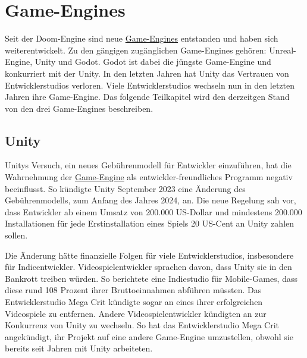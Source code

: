 \section{Game-Engines}
\label{chap:sota game-engines}

Seit der Doom-Engine sind neue \hyperref[chap:game engines]{Game-Engines} entstanden und haben sich weiterentwickelt. Zu den g\"{a}ngigen zug\"{a}nglichen Game-Engines geh\"{o}ren: Unreal-Engine, Unity und Godot. Godot ist dabei die j\"{u}ngste Game-Engine und konkurriert mit der Unity. In den letzten Jahren hat Unity das Vertrauen von Entwicklerstudios verloren. Viele Entwicklerstudios wechseln nun in den letzten Jahren ihre Game-Engine. Das folgende Teilkapitel wird den derzeitgen Stand von den drei Game-Engines beschreiben.  


\subsection{Unity}
\label{chap:sota unity}

Unitys Versuch, ein neues Geb\"{u}hrenmodell f\"{u}r Entwickler einzuf\"{u}hren, hat die Wahrnehmung der \hyperref[chap:game engines]{Game-Engine} als entwickler-freundliches Programm negativ beeinflusst. So k\"{u}ndigte Unity September 2023 eine \"{A}nderung des Geb\"{u}hrenmodells, zum Anfang des Jahres 2024, an. Die neue Regelung sah vor, dass Entwickler ab einem Umsatz von 200.000 US-Dollar und mindestens 200.000 Installationen f\"{u}r jede Erstinstallation eines Spiels 20 US-Cent an Unity zahlen sollen.\autocite{golem1}

Die \"{A}nderung h\"{a}tte finanzielle Folgen f\"{u}r viele Entwicklerstudios, insbesondere f\"{u}r Indieentwickler. Videospielentwickler sprachen davon, dass Unity sie in den Bankrott treiben w\"{u}rden. So berichtete eine Indiestudio f\"{u}r Mobile-Games, dass diese rund 108 Prozent ihrer Bruttoeinnahmen abf\"{u}hren m\"{u}ssten. Das Entwicklerstudio Mega Crit k\"{u}ndigte sogar an eines ihrer erfolgreichen Videospiele zu entfernen. Andere Videospielentwickler k\"{u}ndigten an zur Konkurrenz von Unity zu wechseln. So hat das Entwicklerstudio Mega Crit angek\"{u}ndigt, ihr Projekt auf eine andere Game-Engine umzustellen, obwohl sie bereits seit Jahren mit Unity arbeiteten.\autocite{golem1} 

